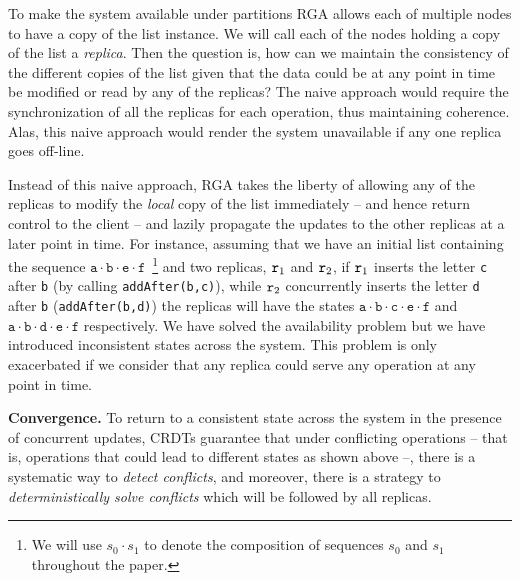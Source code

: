 To make the system available under partitions RGA allows each of
multiple nodes to have a copy of the list instance.
%
We will call each of the nodes holding a copy of the list a \emph{replica}.
%
Then the question is, how can we maintain the consistency of the
different copies of the list given that the data could be at any point
in time be modified or read by any of the replicas?
%
The naive approach would require the synchronization of all the
replicas for each operation, thus maintaining coherence.
%
Alas, this naive approach would render the system unavailable if any
one replica goes off-line.
%

Instead of this naive approach, RGA takes the liberty of allowing any
of the replicas to modify the \emph{local} copy of the list immediately --
and hence return control to the client -- and lazily propagate the
updates to the other replicas at a later point in time.
%
For instance, assuming that we have an initial list containing the
sequence $\mathtt{a \cdot b \cdot e \cdot f}$~\footnote{We will use
  $s_0 \cdot s_1$ to denote the composition of sequences $s_0$ and
  $s_1$ throughout the paper.}
and two replicas, $\mathtt{r}_1$ and $\mathtt{r}_2$, if $\mathtt{r}_1$ inserts the
letter \lstinline|c| after \lstinline|b| (by calling
\lstinline|addAfter(b,c)|), while $\mathtt{r}_2$ concurrently inserts the
letter \lstinline|d| after \lstinline|b| (\lstinline|addAfter(b,d)|)
the replicas will have the states $\mathtt{a \cdot b \cdot c \cdot e
  \cdot f}$ and $\mathtt{a \cdot b \cdot d \cdot e \cdot f}$
respectively.
%
We have solved the availability problem but we have introduced
inconsistent states across the system.
%
This problem is only exacerbated if we consider that any replica could
serve any operation at any point in time.

\smallskip
\noindent
{\bf Convergence.}
To return to a consistent state across the system in the presence of
concurrent updates, CRDTs guarantee that under conflicting operations --
that is, operations that could lead to different states as shown above
--, there is a systematic way to \emph{detect conflicts}, and moreover, there
is a strategy to \emph{deterministically solve conflicts} which will be followed
by all replicas.


